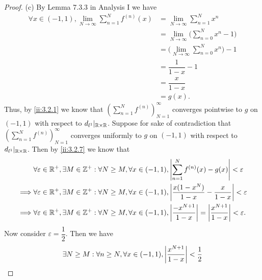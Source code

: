 \begin{proof}{(c)}
  By Lemma 7.3.3 in Analysis I we have
  \begin{align*}
    \forall x \in (-1, 1), \lim_{N \to \infty} \sum_{n = 1}^N f^{(n)}(x) & = \lim_{N \to \infty} \sum_{n = 1}^N x^n                 \\
                                                                         & = \lim_{N \to \infty} \bigg(\sum_{n = 0}^N x^n - 1\bigg) \\
                                                                         & = \bigg(\lim_{N \to \infty} \sum_{n = 0}^N x^n\bigg) - 1 \\
                                                                         & = \dfrac{1}{1 - x} - 1                                   \\
                                                                         & = \dfrac{x}{1 - x}                                       \\
                                                                         & = g(x).
  \end{align*}
  Thus, by \cref{ii:3.2.1} we know that \((\sum_{n = 1}^N f^{(n)})_{N = 1}^\infty\) converges pointwise to \(g\) on \((-1, 1)\) with respect to \(d_{l^1}|_{\mathbb{R} \times \mathbb{R}}\).
  Suppose for sake of contradiction that \((\sum_{n = 1}^N f^{(n)})_{N = 1}^\infty\) converges uniformly to \(g\) on \((-1, 1)\) with respect to \(d_{l^1}|_{\mathbb{R} \times \mathbb{R}}\).
  Then by \cref{ii:3.2.7} we know that
  \begin{align*}
             & \forall \varepsilon \in \mathbb{R}^+, \exists M \in \mathbb{Z}^+ : \forall N \geq M, \forall x \in (-1, 1), \left\lvert\sum_{n = 1}^N f^{(n)}(x) - g(x)\right\rvert < \varepsilon                            \\
    \implies & \forall \varepsilon \in \mathbb{R}^+, \exists M \in \mathbb{Z}^+ : \forall N \geq M, \forall x \in (-1, 1), \left\lvert\dfrac{x(1 - x^N)}{1 - x} - \dfrac{x}{1 - x}\right\rvert < \varepsilon                \\
    \implies & \forall \varepsilon \in \mathbb{R}^+, \exists M \in \mathbb{Z}^+ : \forall N \geq M, \forall x \in (-1, 1), \left\lvert\dfrac{-x^{N + 1}}{1 - x}\right\rvert = \left\lvert\dfrac{x^{N + 1}}{1 - x}\right\rvert < \varepsilon.
  \end{align*}
  Now consider \(\varepsilon = \dfrac{1}{2}\).
  Then we have
  \begin{align*}
             & \exists N \geq M : \forall n \geq N, \forall x \in (-1, 1), \abs{\dfrac{x^{N + 1}}{1 - x}} < \dfrac{1}{2}                                                               \\

\end{align*}
\end{proof}

